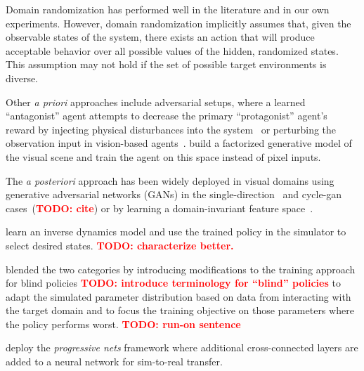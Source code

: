 \documentclass{article}
\newcommand{\TODO}[1]{\textcolor{red}{\textbf{TODO: #1}}}
\begin{document}
Domain randomization has performed well in the literature and in our own experiments.
However, domain randomization implicitly assumes that, given the observable states of the system,
there exists an action that will produce acceptable behavior over all possible values of the hidden, randomized states.
This assumption may not hold if the set of possible target environments is diverse.

Other \emph{a priori} approaches include adversarial setups,
where a learned ``antagonist'' agent attempts to decrease the primary ``protagonist'' agent's reward
by injecting physical disturbances into the system~\citep{pinto-robust-adversarial-RL}
or perturbing the observation input in vision-based agents~\citep{huang-adversarial-attacks}.
\citet{higgins-DARLA} build a factorized generative model of the visual scene
and train the agent on this space instead of pixel inputs.


The \emph{a posteriori} approach has been widely deployed in visual domains
using generative adversarial networks (GANs) in the single-direction~\citep{bousmalis-domain-gan-cvpr17}
and cycle-gan cases~(\TODO{cite})
or by learning a domain-invariant feature space~\citep{bousmalis-domainseparation-nips16}.

\citet{christiano-deep-inverse-dynamics-corr16} learn an inverse dynamics model and use the trained policy in the simulator to select desired states.
\TODO{characterize better.}

\citet{rajeswaran-epopt-corr16} blended the two categories by introducing
modifications to the training approach for blind policies
\TODO{introduce terminology for ``blind'' policies}
to adapt the simulated parameter distribution based on data from interacting with the target domain
and to focus the training objective on those parameters where the policy performs worst.
\TODO{run-on sentence}


\citet{rusu-progressive-nets} deploy the \emph{progressive nets} framework
where additional cross-connected layers are added to a neural network
for sim-to-real transfer.
\end{document}
